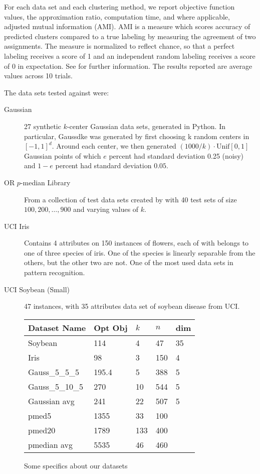 \documentclass{article}
\begin{document}
For each data set and each clustering method, we report objective function values, the approximation ratio, computation time, and where applicable, adjusted mutual information (AMI).  AMI is a measure which scores accuracy of predicted clusters compared to a true labeling by measuring the agreement of two assignments. The measure is normalized to reflect chance, so that a perfect labeling receives a score of 1 and an independent random labeling receives a score of 0 in expectation.  See \cite{Vinh} for further information.  The results reported are average values across 10 trials.

The data sets tested against were:
\begin{description}
\item[Gaussian] 27 synthetic $k$-center Gaussian data sets, generated in Python. In particular, Gauss\textunderscore d\textunderscore k\textunderscore e was generated by first choosing k random centers in $[-1,1]^d$. Around each center, we then generated $(1000/k) \cdot \mathrm{Unif}[0,1]$ Gaussian points of which $e$ percent had standard deviation 0.25 (noisy) and $1-e$ percent had standard deviation $0.05$. 
\item[OR $p$-median Library] From a collection of test data sets created by \cite{Beasley} with 40 test sets of size $100, 200, \ldots, 900$ and varying values of $k$. 
\item[UCI Iris] \cite{Iris} Contains 4 attributes on 150 instances of flowers, each of with belongs to one of three species of iris.  One of the species is linearly separable from the others, but the other two are not.  One of the most used data sets in pattern recognition.
\item[UCI Soybean (Small)] \cite{Soybean} 47 instances, with 35 attributes data set of soybean disease from UCI.
\end{description} 

\begin{figure}[h]
\begin{tabular}{ | l | l | l | l | l | }
\hline
 Dataset Name & Opt Obj & $k$ & $n$ & dim \\ \hline
Soybean & 114 & 4 & 47 & 35 \\ 
Iris & 98 & 3 & 150 & 4 \\ 
Gauss\_5\_5\_5 & 195.4 & 5 & 388 & 5 \\ 
Gauss\_5\_10\_5 & 270 & 10 & 544 & 5 \\ 
Gaussian avg & 241 & 22 & 507 & 5 \\ 
pmed5 & 1355 & 33 & 100 & \  \\ 
pmed20 & 1789 & 133 & 400 & \  \\ 
pmedian avg & 5535 & 46 & 460 & \  \\ \hline
 \end{tabular}
\caption{Some specifics about our datasets}
\end{figure}
\end{document}

